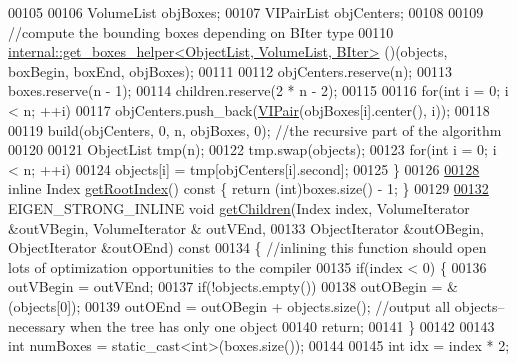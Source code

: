 \begin{DoxyCode}
00105 
00106     VolumeList objBoxes;
00107     VIPairList objCenters;
00108 
00109     \textcolor{comment}{//compute the bounding boxes depending on BIter type}
00110     \hyperlink{struct_eigen_1_1internal_1_1get__boxes__helper}{internal::get\_boxes\_helper<ObjectList, VolumeList, BIter>}
      ()(objects, boxBegin, boxEnd, objBoxes);
00111 
00112     objCenters.reserve(n);
00113     boxes.reserve(n - 1);
00114     children.reserve(2 * n - 2);
00115 
00116     \textcolor{keywordflow}{for}(\textcolor{keywordtype}{int} i = 0; i < n; ++i)
00117       objCenters.push\_back(\hyperlink{struct_eigen_1_1internal_1_1vector__int__pair}{VIPair}(objBoxes[i].center(), i));
00118 
00119     build(objCenters, 0, n, objBoxes, 0); \textcolor{comment}{//the recursive part of the algorithm}
00120 
00121     ObjectList tmp(n);
00122     tmp.swap(objects);
00123     \textcolor{keywordflow}{for}(\textcolor{keywordtype}{int} i = 0; i < n; ++i)
00124       objects[i] = tmp[objCenters[i].second];
00125   \}
00126 
\hyperlink{class_eigen_1_1_kd_b_v_h_a8111486ece7980dd8f0d10aff9693d11}{00128}   \textcolor{keyword}{inline} Index \hyperlink{class_eigen_1_1_kd_b_v_h_a8111486ece7980dd8f0d10aff9693d11}{getRootIndex}()\textcolor{keyword}{ const }\{ \textcolor{keywordflow}{return} (\textcolor{keywordtype}{int})boxes.size() - 1; \}
00129 
\hyperlink{class_eigen_1_1_kd_b_v_h_a67326b18fcf16f341d2e4a16006d0205}{00132}   EIGEN\_STRONG\_INLINE \textcolor{keywordtype}{void} \hyperlink{class_eigen_1_1_kd_b_v_h_a67326b18fcf16f341d2e4a16006d0205}{getChildren}(Index index, VolumeIterator &outVBegin, VolumeIterator &
      outVEnd,
00133                                        ObjectIterator &outOBegin, ObjectIterator &outOEnd)\textcolor{keyword}{ const}
00134 \textcolor{keyword}{  }\{ \textcolor{comment}{//inlining this function should open lots of optimization opportunities to the compiler}
00135     \textcolor{keywordflow}{if}(index < 0) \{
00136       outVBegin = outVEnd;
00137       \textcolor{keywordflow}{if}(!objects.empty())
00138         outOBegin = &(objects[0]);
00139       outOEnd = outOBegin + objects.size(); \textcolor{comment}{//output all objects--necessary when the tree has only one
       object}
00140       \textcolor{keywordflow}{return};
00141     \}
00142 
00143     \textcolor{keywordtype}{int} numBoxes = \textcolor{keyword}{static\_cast<}\textcolor{keywordtype}{int}\textcolor{keyword}{>}(boxes.size());
00144 
00145     \textcolor{keywordtype}{int} idx = index * 2;

\end{DoxyCode}
